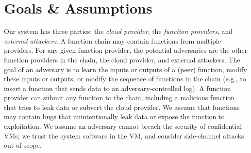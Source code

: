 \section{Goals \& Assumptions}
\label{sec:goals}

%
Our \SystemName system has three parties: the \emph{cloud provider}, the
\emph{function providers}, and \emph{external attackers}.
%
A function chain may contain functions from multiple providers.
%
For any given function provider, the potential adversaries
are the other function providers in the chain, the cloud provider, and
external attackers.
%
The goal of an adversary is to learn the inputs or outputs of a (peer)
function, modify these inputs or outputs, or modify the sequence of functions
in the chain (e.g., to insert a function that sends data to an
adversary-controlled log).
%
A function provider can submit any function to the chain, including a
malicious function that tries to leak data or subvert the cloud
provider.
%
We assume that functions may contain bugs that unintentionally leak
data or expose the function to exploitation.
%
We assume an adversary cannot breach the security of confidential VMs; we trust
the system software in the VM, and consider side-channel attacks out-of-scope.
%


